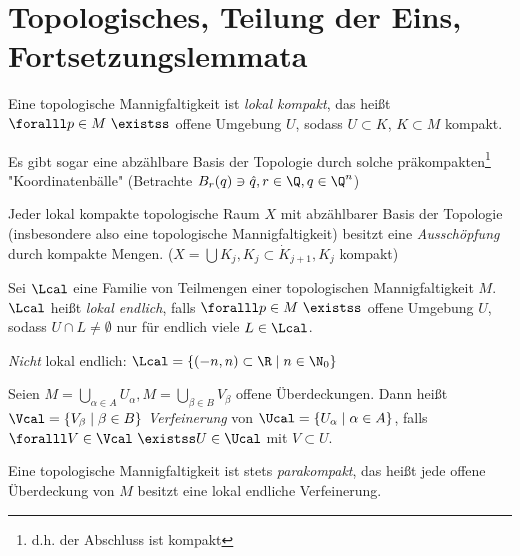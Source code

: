 \chapter{Topologisches, Teilung der Eins, Fortsetzungslemmata}
\lecture

\begin{lem}
	Eine topologische Mannigfaltigkeit ist \emph{lokal kompakt}, das heißt $ \foralll p \in  M \ \existss $ offene Umgebung $U$, sodass $ U \subset K $, $K \subset M$ kompakt.
\end{lem}

\begin{rem}\label{5.2}
	Es gibt sogar eine abzählbare Basis der Topologie durch solche präkompakten\footnote{d.h. der Abschluss ist kompakt}  "Koordinatenbälle" (Betrachte $ B_r(q) \ni \hat{q}, r \in \Q, q \in \Q^n $)
\end{rem}

\begin{lem}
	Jeder lokal kompakte topologische Raum $X$ mit abzählbarer Basis der Topologie (insbesondere also eine topologische Mannigfaltigkeit) besitzt eine \emph{Ausschöpfung} durch kompakte Mengen. ($X = \bigcup K_j, K_j \subset \dot{K}_{j+1}, K_j$ kompakt)
\end{lem}

\begin{defn*}
	Sei $\Lcal$ eine Familie von Teilmengen einer topologischen Mannigfaltigkeit $M$. $\Lcal$ heißt \emph{lokal endlich}, falls $ \foralll p \in M \ \existss $ offene Umgebung $U$, sodass $ U \cap L \neq \emptyset $ nur für endlich viele $L \in \Lcal$.
\end{defn*}

\emph{Nicht} lokal endlich: $ \Lcal = \{(-n,n) \subset \R \mid n \in \N_0\} $

\begin{defn*}[Verfeinerung]
	Seien $ M = \bigcup_{\alpha \in A} U_\alpha, M = \bigcup_{\beta \in B} V_\beta $ offene Überdeckungen. Dann heißt $ \Vcal = \{V_\beta \mid \beta \in B\} $ \emph{Verfeinerung} von $ \Ucal = \{U_\alpha \mid \alpha \in A\} $, falls $ \foralll V \in \Vcal \ \existss U \in \Ucal $ mit $ V \subset U $.
\end{defn*}

\begin{thm}
	Eine topologische Mannigfaltigkeit ist stets \emph{parakompakt}, das heißt jede offene Überdeckung von $M$ besitzt eine lokal endliche Verfeinerung.
\end{thm}

